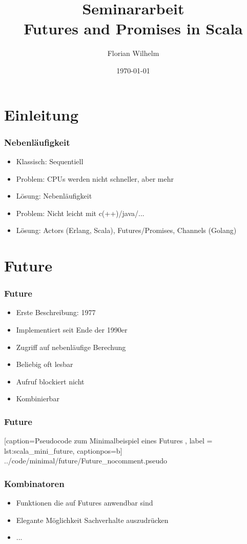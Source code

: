 \documentclass{beamer}
\title[]{Seminararbeit\\Futures and Promises in Scala}
\author{Florian Wilhelm}
\date{\today{}}
\begin{document}
\frame{
\titlepage
}


\section{Einleitung}

\setcounter{subsection}{1}
\begin{frame}
  \frametitle{Nebenläufigkeit}
  \begin{itemize}
    \item{Klassisch: Sequentiell}
    \item{Problem: CPUs werden nicht schneller, aber mehr}
    \item{Lösung: Nebenläufigkeit}
    \item{Problem: Nicht leicht mit c(++)/java/...}
    \item{Lösung: Actors (Erlang, Scala), Futures/Promises, Channels (Golang)}
   \end{itemize}
\end{frame}

\section{Future}

\setcounter{subsection}{1}
\begin{frame}
  \frametitle{Future}
   \begin{itemize}
    \item{Erste Beschreibung: 1977}
    \item{Implementiert seit Ende der 1990er}
    \item{Zugriff auf nebenläufige Berechung}
    \item{Beliebig oft lesbar}
    \item{Aufruf blockiert nicht}
    \item{Kombinierbar}
   \end{itemize}
\end{frame}

\setcounter{subsection}{1}
\begin{frame}
  \frametitle{Future}
    
        [caption={Pseudocode zum Minimalbeispiel eines Futures },
           label = lst:scala_mini_future,
           captionpos=b]
     {../code/minimal/future/Future_nocomment.pseudo}
\end{frame}

\setcounter{subsection}{1}
\begin{frame}
  \frametitle{Kombinatoren}
   \begin{itemize}
    \item{Funktionen die auf Futures anwendbar sind}
    \item{Elegante Möglichkeit Sachverhalte auszudrücken}
    \item{...}
   \end{itemize}  
\end{frame}
\end{document}
